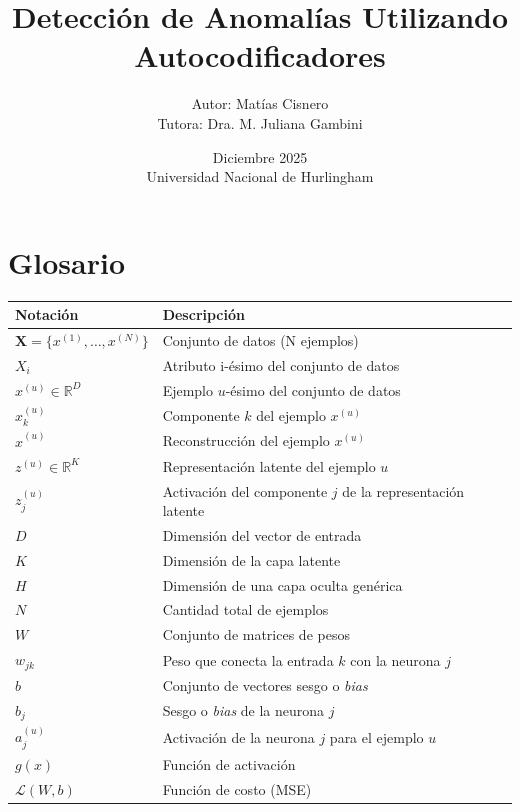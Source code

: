 \documentclass[a4paper,10pt]{book}
\title{Detección de Anomalías Utilizando Autocodificadores}
\author{Autor: Matías Cisnero\\ Tutora: Dra. M. Juliana Gambini}
\date{Diciembre 2025 \\ Universidad Nacional de Hurlingham}
\renewcommand{\contentsname}{\'Indice General}
\renewcommand{\listfigurename}{\'Indice de Figuras}
\renewcommand{\listtablename}{\'Indice de Tablas}
\renewcommand{\lstlistingname}{Salida}
\renewcommand\tablename{Tabla}
\renewcommand{\figurename}{Figura}
\begin{document}
\renewcommand{\contentsname}{\'Indice General}
\renewcommand{\listfigurename}{\'Indice de Figuras}
\renewcommand{\listtablename}{\'Indice de Tablas}
\renewcommand{\lstlistingname}{Salida}
\renewcommand\tablename{Tabla}
\renewcommand{\figurename}{Figura}

\maketitle

\tableofcontents
\listoffigures
\listoftables

\newpage
\section*{Glosario}
\begin{table}[H]
	\centering
	\begin{tabular}{ll}
		\toprule
		\textbf{Notación} & \textbf{Descripción} \\
		\midrule
		$\mathbf{X} = \{x^{(1)}, \ldots, x^{(N)}\}$ & Conjunto de datos (N ejemplos) \\
		$X_i$ & Atributo i-ésimo del conjunto de datos\\
		$x^{(u)} \in \mathbb{R}^{D}$ & Ejemplo $u$-ésimo del conjunto de datos \\
		$x_k^{(u)}$ & Componente $k$ del ejemplo $x^{(u)}$ \\
		$\hat{x}^{(u)}$ & Reconstrucción del ejemplo $x^{(u)}$ \\
		$z^{(u)} \in \mathbb{R}^{K}$ & Representación latente del ejemplo $u$ \\
		$z_j^{(u)}$ & Activación del componente $j$ de la representación latente \\
		$D$ & Dimensión del vector de entrada \\
		$K$ & Dimensión de la capa latente \\
		$H$ & Dimensión de una capa oculta genérica \\
		$N$ & Cantidad total de ejemplos \\
		$W$ & Conjunto de matrices de pesos \\
		$w_{jk}$ & Peso que conecta la entrada $k$ con la neurona $j$ \\
		$b$ & Conjunto de vectores sesgo o \emph{bias} \\
		$b_{j}$ & Sesgo o \emph{bias} de la neurona $j$ \\
		$a_j^{(u)}$ & Activación de la neurona $j$ para el ejemplo $u$ \\
		$g(x)$ & Función de activación \\
		$\mathcal{L}(W,b)$ & Función de costo (MSE) \\
		

\end{tabular}
\end{table}
\end{document}
